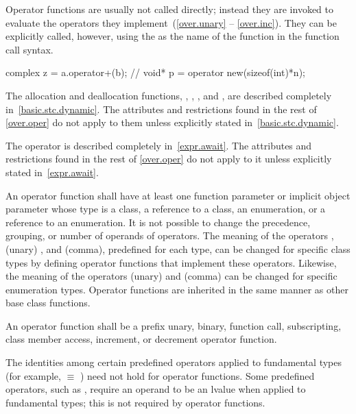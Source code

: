 \pnum
{}%
Operator functions are usually not called directly; instead they are invoked
to evaluate the operators they implement~(\ref{over.unary} -- \ref{over.inc}).
They can be explicitly called, however, using the
as the name of the function in the function call syntax.
\begin{example}
\begin{codeblock}
complex z = a.operator+(b);     // 
void* p = operator new(sizeof(int)*n);
\end{codeblock}
\end{example}

\pnum
The allocation and deallocation functions,
 ,
 ,
 , and
 ,
are described completely in~\ref{basic.stc.dynamic}.
The attributes and restrictions
found in the rest of \ref{over.oper} do not apply to them unless explicitly
stated in~\ref{basic.stc.dynamic}.

\pnum
The  operator is described completely in~\ref{expr.await}.
The attributes and restrictions
found in the rest of \ref{over.oper} do not apply to it unless explicitly
stated in~\ref{expr.await}.

\pnum
{}%
An operator function
shall have at least one
function parameter or implicit object parameter whose type is
a class, a reference to a class, an
enumeration, or a reference to an enumeration.
It is not possible to change the precedence, grouping, or number of operands
of operators.
The meaning of
the operators \tcode{=}, (unary) \tcode{\&}, and \tcode{,} (comma),
predefined for each type, can be changed for specific class types by
defining operator functions that implement these operators.
Likewise, the meaning of the operators (unary) \tcode{\&} and \tcode{,} (comma)
can be changed for specific enumeration types.
%
Operator functions are inherited in the same manner as other base class
functions.

\pnum
An operator function shall be a
prefix unary, binary, function call, subscripting, class member access, increment, or decrement
operator function.

\pnum
{}%
\begin{note}
The identities among certain predefined operators applied to fundamental types
(for example,
 $\equiv$
)
need not hold for operator functions.
Some predefined operators, such as
\tcode{+=},
require an operand to be an lvalue when applied to fundamental types;
this is not required by operator functions.
\end{note}

